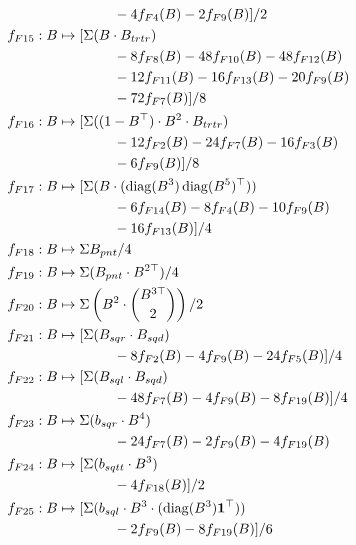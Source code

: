 \documentclass{article}
\theoremstyle{plain}
\DeclareMathOperator{\diag}{diag}
\begin{document}
\begin{align*}
                                &\qquad\qquad-4f_{F4}(B)-2f_{F9}(B)]/2\\
        f_{F15} : B&\mapsto [\Sigma(B\cdot B_{trtr})\\
                                &\qquad\qquad-8f_{F8}(B)-48f_{F10}(B)-48f_{F12}(B)\\
                                &\qquad\qquad-12f_{F11}(B)-16f_{F13}(B)-20f_{F9}(B)\\
                                &\qquad\qquad-72f_{F7}(B)]/8\\
        f_{F16} : B&\mapsto [\Sigma((1-B^\top)\cdot B^2\cdot B_{trtr})\\
                                &\qquad\qquad-12f_{F2}(B)-24f_{F7}(B)-16f_{F3}(B)\\
                                &\qquad\qquad-6f_{F9}(B)]/8\\
        f_{F17} : B&\mapsto [\Sigma(B\cdot(\diag(B^3)\diag(B^5)^\top))\\
                                &\qquad\qquad-6f_{F14}(B)-8f_{F4}(B)-10f_{F9}(B)\\
                                &\qquad\qquad-16f_{F13}(B)]/4\\
        f_{F18} : B&\mapsto \Sigma B_{pnt}/4\\
        f_{F19} : B&\mapsto \Sigma(B_{pnt}\cdot B^{2\top})/4\\
        f_{F20} : B&\mapsto \Sigma\left(B^2\cdot \binom{B^{3\top}}{2}\right)/2\\
        f_{F21} : B&\mapsto [\Sigma(B_{sqr}\cdot B_{sqd})\\
                                &\qquad\qquad-8f_{F2}(B)-4f_{F9}(B)-24f_{F5}(B)]/4\\
        f_{F22} : B&\mapsto [\Sigma(B_{sql}\cdot B_{sqd})\\
                                &\qquad\qquad-48f_{F7}(B)-4f_{F9}(B)-8f_{F19}(B)]/4\\
        f_{F23} : B&\mapsto \Sigma(b_{sqr}\cdot B^4)\\
                                &\qquad\qquad-24f_{F7}(B)-2f_{F9}(B)-4f_{F19}(B)\\
        f_{F24} : B&\mapsto [\Sigma(b_{sqtt}\cdot B^3)\\
                                &\qquad\qquad-4f_{F18}(B)]/2\\
        f_{F25} : B&\mapsto [\Sigma(b_{sql}\cdot B^3\cdot (\diag(B^3){\bf 1}^\top))\\
                                &\qquad\qquad-2f_{F9}(B)-8f_{F19}(B)]/6\\

\end{align*}
\end{document}
